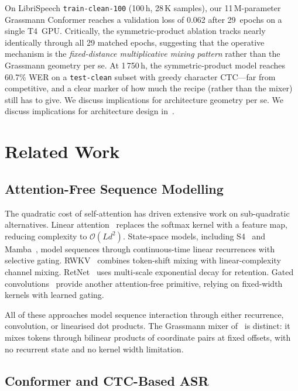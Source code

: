 \documentclass[11pt,a4paper]{article}
\begin{document}
On LibriSpeech \texttt{train-clean-100} (100\,h, 28\,K samples), our
11\,M-parameter Grassmann Conformer reaches a validation loss of 0.062
after 29~epochs on a single T4~GPU.  Critically, the symmetric-product
ablation tracks nearly identically through all 29 matched epochs,
suggesting that the operative mechanism is the \emph{fixed-distance
multiplicative mixing pattern} rather than the Grassmann geometry per
se.  At 1\,750\,h, the symmetric-product model reaches 60.7\% WER on a
\texttt{test-clean} subset with greedy character CTC---far from
competitive, and a clear marker of how much the recipe (rather than the
mixer) still has to give.  We discuss implications for architecture
 geometry per se.  We discuss implications for
architecture design in~.

\section{Related Work}
\label{sec:related}

\subsection{Attention-Free Sequence Modelling}

The quadratic cost of self-attention has driven extensive work on
sub-quadratic alternatives.  Linear attention~\citep{katharopoulos2020linear}
replaces the softmax kernel with a feature map, reducing complexity to
$\mathcal{O}(Ld^2)$.  State-space models, including
S4~\citep{gu2022s4} and Mamba~\citep{gu2023mamba}, model
sequences through continuous-time linear recurrences with selective
gating.  RWKV~\citep{peng2023rwkv} combines token-shift mixing with
linear-complexity channel mixing.  RetNet~\citep{sun2023retnet} uses
multi-scale exponential decay for retention.  Gated
convolutions~\citep{dauphin2017language} provide another attention-free
primitive, relying on fixed-width kernels with learned gating.

All of these approaches model sequence interaction through either
recurrence, convolution, or linearised dot products.  The Grassmann
mixer of~\citet{dong2025attention} is distinct: it mixes tokens through
bilinear products of coordinate pairs at fixed offsets, with no
recurrent state and no kernel width limitation.

\subsection{Conformer and CTC-Based ASR}
\end{document}
